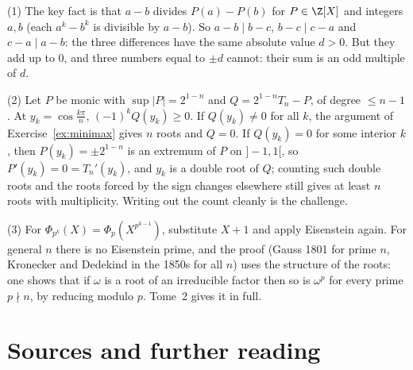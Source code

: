 (1) The key fact is that $a-b$ divides $P(a)-P(b)$ for $P\in\Z[X]$ and integers $a,b$ (each $a^k-b^k$ is divisible by $a-b$). So $a-b\mid b-c$, $b-c\mid c-a$ and $c-a\mid a-b$: the three differences have the same absolute value $d>0$. But they add up to $0$, and three numbers equal to $\pm d$ cannot: their sum is an odd multiple of $d$.

(2) Let $P$ be monic with $\sup|P|=2^{1-n}$ and $Q=2^{1-n}T_n-P$, of degree $\le n-1$. At $y_k=\cos\frac{k\pi}n$, $(-1)^kQ(y_k)\ge0$. If $Q(y_k)\ne0$ for all $k$, the argument of Exercise~\ref{ex:minimax} gives $n$ roots and $Q=0$. If $Q(y_k)=0$ for some interior $k$, then $P(y_k)=\pm2^{1-n}$ is an extremum of $P$ on $]-1,1[$, so $P'(y_k)=0=T_n'(y_k)$, and $y_k$ is a double root of $Q$; counting such double roots and the roots forced by the sign changes elsewhere still gives at least $n$ roots with multiplicity. Writing out the count cleanly is the challenge.

(3) For $\Phi_{p^k}(X)=\Phi_p(X^{p^{k-1}})$, substitute $X+1$ and apply Eisenstein again. For general $n$ there is no Eisenstein prime, and the proof (Gauss 1801 for prime $n$, Kronecker and Dedekind in the 1850s for all $n$) uses the structure of the roots: one shows that if $\omega$ is a root of an irreducible factor then so is $\omega^p$ for every prime $p\nmid n$, by reducing modulo $p$. Tome~2 gives it in full.

\section*{Sources and further reading}


